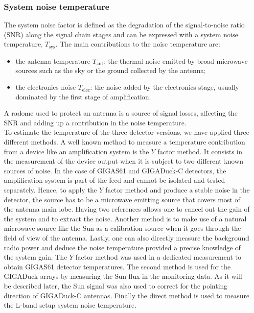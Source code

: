 \subsubsection{System noise temperature}
The  system  noise  factor  is  defined  as  the  degradation  of  the
signal-to-noise ratio (SNR) along the signal chain stages  and can be
expressed with a system  noise temperature, $T_{\text{sys}}$. The main
contributions to the noise temperature are:
\begin{itemize}
\item  the antenna  temperature $T_{\text{ant}}  $: the  thermal noise
  emitted by  broad microwave  sources such as  the sky or  the ground
  collected by the antenna;
\item the electronics noise  $T_{\text{elec}}$: the noise added by the
  electronics  stage,   usually  dominated  by  the   first  stage  of
  amplification.
\end{itemize}
A radome  used to  protect an  antenna is a  source of  signal losses,
affecting  the  SNR  and  adding   up  a  contribution  in  the  noise
temperature.\\  To  estimate the  temperature  of  the three  detector
versions,  we have  applied  three different  methods.   A well  known
method to  measure a  temperature contribution from  a device  like an
amplification system  is the  $Y$ factor method.   It consists  in the
measurement of the  device output when it is  subject to two different
known  sources   of  noise.   In   the  case  of   \mbox{GIGAS61}  and
\mbox{GIGADuck-C} detectors,  the amplification system is  part of the
feed and cannot be isolated and tested separately. Hence, to apply the
$Y$  factor method and  produce a  stable noise  in the  detector, the
source has to  be a microwave emitting source that  covers most of the
antenna main lobe.  Having two references allows one to cancel out the
gain of  the system and  to extract the  noise.  Another method  is to
make use of  a natural microwave source like the  Sun as a calibration
source when it goes through the field of view of the antenna.  Lastly,
one can  also directly measure  the background radio power  and deduce
the noise temperature provided a precise knowledge of the system gain.
The $Y$  factor method was used  in a dedicated  measurement to obtain
\mbox{GIGAS61} detector  temperatures.  The second method  is used for
the  GIGADuck arrays  by  measuring  the Sun  flux  in the  monitoring
data. As it  will be described later, the Sun signal  was also used to
correct    for   the    pointing   direction    of   \mbox{GIGADuck-C}
antennas.  Finally the  direct method  is used  to measure  the L-band
setup system noise temperature.
